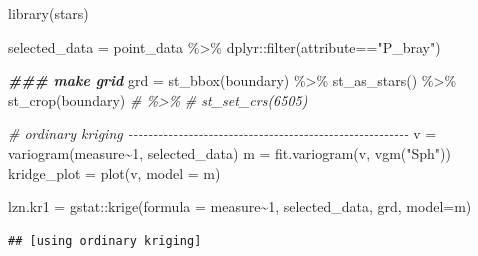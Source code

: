 \documentclass[
]{book}
\newenvironment{Shaded}{\begin{snugshade}}{\end{snugshade}}
\newcommand{\AttributeTok}[1]{\textcolor[rgb]{0.77,0.63,0.00}{#1}}
\newcommand{\CommentTok}[1]{\textcolor[rgb]{0.56,0.35,0.01}{\textit{#1}}}
\newcommand{\DecValTok}[1]{\textcolor[rgb]{0.00,0.00,0.81}{#1}}
\newcommand{\DocumentationTok}[1]{\textcolor[rgb]{0.56,0.35,0.01}{\textbf{\textit{#1}}}}
\newcommand{\FloatTok}[1]{\textcolor[rgb]{0.00,0.00,0.81}{#1}}
\newcommand{\FunctionTok}[1]{\textcolor[rgb]{0.00,0.00,0.00}{#1}}
\newcommand{\NormalTok}[1]{#1}
\newcommand{\OtherTok}[1]{\textcolor[rgb]{0.56,0.35,0.01}{#1}}
\newcommand{\SpecialCharTok}[1]{\textcolor[rgb]{0.00,0.00,0.00}{#1}}
\newcommand{\StringTok}[1]{\textcolor[rgb]{0.31,0.60,0.02}{#1}}
\begin{document}
\begin{Shaded}
\begin{Highlighting}[]
\FunctionTok{library}\NormalTok{(stars)}

\NormalTok{selected\_data }\OtherTok{=}\NormalTok{ point\_data }\SpecialCharTok{\%\textgreater{}\%}
\NormalTok{  dplyr}\SpecialCharTok{::}\FunctionTok{filter}\NormalTok{(attribute}\SpecialCharTok{==}\StringTok{"P\_bray"}\NormalTok{)}

\DocumentationTok{\#\#\# make grid}
\NormalTok{grd }\OtherTok{=} \FunctionTok{st\_bbox}\NormalTok{(boundary) }\SpecialCharTok{\%\textgreater{}\%}
  \FunctionTok{st\_as\_stars}\NormalTok{() }\SpecialCharTok{\%\textgreater{}\%}
  \FunctionTok{st\_crop}\NormalTok{(boundary) }
\CommentTok{\# \%\textgreater{}\%}
  \CommentTok{\# st\_set\_crs(6505)}


\CommentTok{\# ordinary kriging {-}{-}{-}{-}{-}{-}{-}{-}{-}{-}{-}{-}{-}{-}{-}{-}{-}{-}{-}{-}{-}{-}{-}{-}{-}{-}{-}{-}{-}{-}{-}{-}{-}{-}{-}{-}{-}{-}{-}{-}{-}{-}{-}{-}{-}{-}{-}{-}{-}{-}{-}{-}{-}{-}{-}{-}}
\NormalTok{v }\OtherTok{=} \FunctionTok{variogram}\NormalTok{(measure}\SpecialCharTok{\textasciitilde{}}\DecValTok{1}\NormalTok{, selected\_data)}
\NormalTok{m }\OtherTok{=} \FunctionTok{fit.variogram}\NormalTok{(v, }\FunctionTok{vgm}\NormalTok{(}\StringTok{"Sph"}\NormalTok{))}
\NormalTok{kridge\_plot }\OtherTok{=} \FunctionTok{plot}\NormalTok{(v, }\AttributeTok{model =}\NormalTok{ m) }

\NormalTok{lzn.kr1 }\OtherTok{=}\NormalTok{ gstat}\SpecialCharTok{::}\FunctionTok{krige}\NormalTok{(}\AttributeTok{formula =}\NormalTok{ measure}\SpecialCharTok{\textasciitilde{}}\DecValTok{1}\NormalTok{, selected\_data, grd, }\AttributeTok{model=}\NormalTok{m)}
\end{Highlighting}
\end{Shaded}

\begin{verbatim}
## [using ordinary kriging]
\end{verbatim}

\begin{Shaded}
\end{Shaded}
\end{document}
